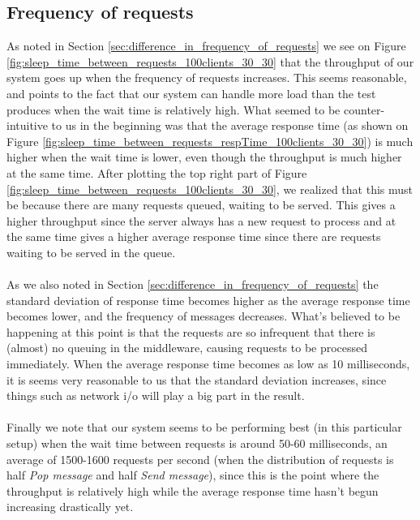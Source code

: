 \documentclass{article}
\begin{document}
        \subsection{Frequency of requests}
            \label{sec:frequency_of_requests}
            As noted in Section \ref{sec:difference_in_frequency_of_requests} we see on Figure \ref{fig:sleep_time_between_requests_100clients_30_30} that the throughput of our system goes up when the frequency of requests increases. This seems reasonable, and points to the fact that our system can handle more load than the test produces when the wait time is relatively high. What seemed to be counter-intuitive to us in the beginning was that the average response time (as shown on Figure \ref{fig:sleep_time_between_requests_respTime_100clients_30_30}) is much higher when the wait time is lower, even though the throughput is much higher at the same time. After plotting the top right part of Figure \ref{fig:sleep_time_between_requests_100clients_30_30}, we realized that this must be because there are many requests queued, waiting to be served. This gives a higher throughput since the server always has a new request to process and at the same time gives a higher average response time since there are requests waiting to be served in the queue.\\
            \\
            As we also noted in Section \ref{sec:difference_in_frequency_of_requests} the standard deviation of response time becomes higher as the average response time becomes lower, and the frequency of messages decreases. What's believed to be happening at this point is that the requests are so infrequent that there is (almost) no queuing in the middleware, causing requests to be processed immediately. When the average response time becomes as low as 10 milliseconds, it is seems very reasonable to us that the standard deviation increases, since things such as network i/o will play a big part in the result.\\
            \\
            Finally we note that our system seems to be performing best (in this particular setup) when the wait time between requests is around 50-60 milliseconds, an average of 1500-1600 requests per second (when the distribution of requests is half \textit{Pop message} and half \textit{Send message}), since this is the point where the throughput is relatively high while the average response time hasn't begun increasing drastically yet.
\end{document}
